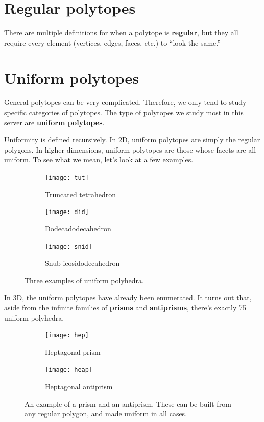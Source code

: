 \documentclass{article}
\begin{document}
\section{Regular polytopes}
There are multiple definitions for when a polytope is \textbf{regular},
but they all require every element (vertices, edges, faces, etc.) to ``look the same.''

\section{Uniform polytopes}
General polytopes can be very complicated. Therefore, we only tend to study specific categories of polytopes. The type of polytopes we study most in this server are \textbf{uniform polytopes}.

Uniformity is defined recursively. In 2D, uniform polytopes are simply the regular polygons.
In higher dimensions, uniform polytopes are those whose facets are all uniform. To see what we mean, let's look at a few examples.

\begin{figure}[H]
\centering
\begin{subfigure}{.33333\textwidth}
  \centering
  \texttt{[image: tut]}
  \caption{Truncated tetrahedron}
  \label{fig:tut}
\end{subfigure}%
\begin{subfigure}{.33333\textwidth}
  \centering
  \texttt{[image: did]}
  \caption{Dodecadodecahedron}
  \label{fig:did}
\end{subfigure}%
\begin{subfigure}{.33333\textwidth}
  \centering
  \texttt{[image: snid]}
  \caption{Snub icosidodecahedron}
  \label{fig:snid}
\end{subfigure}%
\caption{Three examples of uniform polyhedra.}
\label{fig:uniforms3D}
\end{figure}

In 3D, the uniform polytopes have already been enumerated. It turns out that, aside from the infinite families of \textbf{prisms} and \textbf{antiprisms}, there's exactly 75 uniform polyhedra.

\begin{figure}[H]
\centering
\begin{subfigure}{.5\textwidth}
  \centering
  \texttt{[image: hep]}
  \caption{Heptagonal prism}
  \label{fig:hep}
\end{subfigure}%
\begin{subfigure}{.5\textwidth}
  \centering
  \texttt{[image: heap]}
  \caption{Heptagonal antiprism}
  \label{fig:heap}
\end{subfigure}%
\caption{An example of a prism and an antiprism. These can be built from any regular polygon, and made uniform in all cases.}
\label{fig:prisms}
\end{figure}
\end{document}
